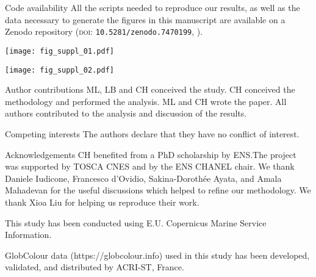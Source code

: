 \begin{articleSubBlock}{Code availability}
    All the scripts needed to reproduce our results, as well as the data necessary to generate the figures in this manuscript are available on a Zenodo repository (\textsc{doi}: \texttt{10.5281/zenodo.7470199}, \cite{haeck_2022_zenodo}).
\end{articleSubBlock}


\begin{figure*}
  \centering
  \texttt{[image: fig\_suppl\_01.pdf]}
  \caption[Sensitivity of the seasonal impact of fronts on HI parameters]{
    Climatological mean of  median values (top row) over weak fronts (blue), strong fronts (green) and background (red), surface fraction occupied by weak fronts and strong fronts (middle row), and global  excess due to weak and strong fronts (bottom row).
    Each line represent a set of parameter with the bolder line indicating the retained set of parameters.
    The tested rolling window sizes are \qty{20}{\km}, \qty{30}{\km}, and \qty{40}{\km}.
    Different normalization coefficients are tested for a \qty{30}{\km} window size: double the variance, double the bimodality, and double the skewness.
  }%
 \label{fig:ts-sensitivity}
\end{figure*}

\begin{figure*}
  \centering
  \texttt{[image: fig\_suppl\_02.pdf]}
  \caption[Seasonal distributions of Chl-\textit{a}]{
    Distribution of  of the year~2007 by seasons~(rows), for the three biomes~(columns), and for the background~(red), weak fronts~(blue) and strong fronts~(green).
    The median value of each distribution is indicated by a vertical line.
  }
  \label{fig:hist-chl}
\end{figure*}

\begin{articleSubBlock}{Author contributions}
  ML, LB and CH conceived the study. CH conceived the methodology and performed the analysis. ML and CH wrote the paper. All authors contributed to the analysis and discussion of the results.
\end{articleSubBlock}

\begin{articleSubBlock}{Competing interests}
  The authors declare that they have no conflict of interest.
\end{articleSubBlock}

\begin{articleSubBlock}{Acknowledgements}
  CH benefited from a PhD scholarship by ENS.\@ The project was supported by TOSCA CNES and by the ENS CHANEL chair.
  We thank Daniele Iudicone, Francesco d'Ovidio, Sakina-Dorothée Ayata, and Amala Mahadevan for the useful discussions which helped to refine our methodology. We thank Xioa Liu for helping us reproduce their work.

  This study has been conducted using E.U. Copernicus Marine Service Information.

  GlobColour data (https://globcolour.info) used in this study has been developed, validated, and distributed by ACRI-ST, France.
\end{articleSubBlock}
